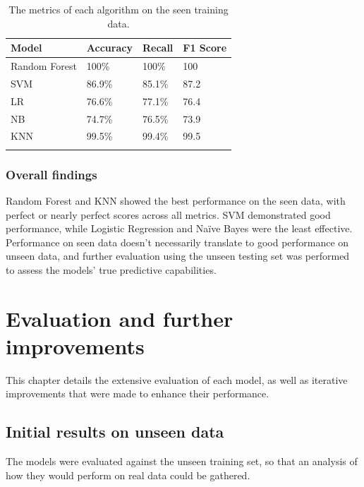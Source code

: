 \documentclass[12pt]{report}
\begin{document}

\begin{longtable}{ | p{} | p{} | p{} | p{} | }
    \hline
    \cellcolor{blue!25} Model & \cellcolor{blue!25} Accuracy & \cellcolor{blue!25} Recall & \cellcolor{blue!25} F1 Score\\
    \hline
    Random Forest & 100\% & 100\% & 100\\ 
    \hline
    SVM & 86.9\% & 85.1\% & 87.2 \\
    \hline
    LR & 76.6\% & 77.1\% & 76.4\\
    \hline
    NB & 74.7\% & 76.5\% & 73.9\\
    \hline
    KNN & 99.5\% & 99.4\% & 99.5 \\
    \hline
    \caption{The metrics of each algorithm on the seen training data.}\label{tab:Iteration1Training}
\end{longtable}

\subsection{Overall findings}
Random Forest and KNN showed the best performance on the seen data, with perfect or nearly perfect scores across all metrics. 
SVM demonstrated good performance, while Logistic Regression and Naïve Bayes were the least effective. 
Performance on seen data doesn't necessarily translate to good performance on unseen data, and further
evaluation using the unseen testing set was performed to assess the models' true predictive capabilities.


\chapter{Evaluation and further improvements}
This chapter details the extensive evaluation of each model, as well as iterative improvements 
that were made to enhance their performance.

\section{Initial results on unseen data}
The models were evaluated against the unseen training set, so that an analysis 
of how they would perform on real data could be gathered.
\end{document}
